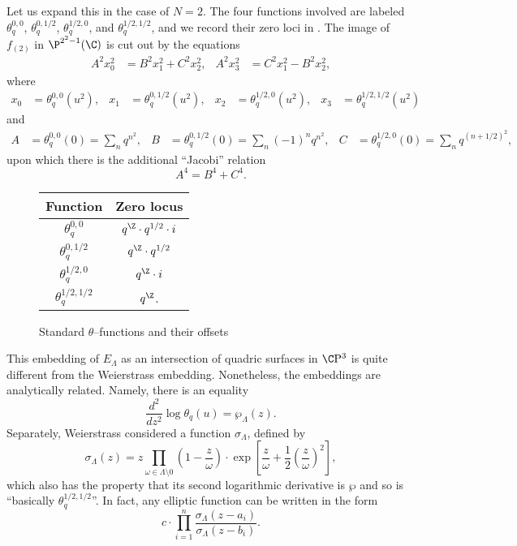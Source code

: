 \begin{example}
Let us expand this in the case of $N = 2$.  The four functions involved are labeled $\theta_q^{0,0}$, $\theta_q^{0,1/2}$, $\theta_q^{1/2,0}$, and $\theta_q^{1/2,1/2}$, and we record their zero loci in .  The image of $f_{(2)}$ in $\P^{2^2 - 1}(\C)$ is cut out by the equations
\begin{align*}
A^2 x_0^2 & = B^2 x_1^2 + C^2 x_2^2, &
A^2 x_3^2 & = C^2 x_1^2 - B^2 x_2^2,
\end{align*}
where
\begin{align*}
x_0 & = \theta_q^{0, 0}(u^2), &
x_1 & = \theta_q^{0, 1/2}(u^2), &
x_2 & = \theta_q^{1/2, 0}(u^2), &
x_3 & = \theta_q^{1/2, 1/2}(u^2)
\end{align*}
and
\begin{align*}
A & = \theta_q^{0, 0}(0) = \sum_n q^{n^2}, &
B & = \theta_q^{0, 1/2}(0) = \sum_n (-1)^n q^{n^2}, &
C & = \theta_q^{1/2, 0}(0) = \sum_n q^{(n + 1/2)^2},
\end{align*}
upon which there is the additional ``Jacobi'' relation \[A^4 = B^4 + C^4.\]
\end{example}

\begin{figure}
\begin{center}
\begin{tabular}{@{}cc@{}} \toprule
Function & Zero locus \\
\midrule
$\theta_q^{0,0}$ & $q^{\Z} \cdot q^{1/2} \cdot i$ \\
$\theta_q^{0,1/2}$ & $q^{\Z} \cdot q^{1/2}$ \\
$\theta_q^{1/2,0}$ & $q^{\Z} \cdot i$ \\
$\theta_q^{1/2,1/2}$ & $q^{\Z}$. \\ \bottomrule
\end{tabular}
\end{center}
\caption{Standard $\theta$--functions and their offsets}\label{ThetaFunctionsTable}
\end{figure}

\begin{remark}
This embedding of $E_\Lambda$ as an intersection of quadric surfaces in $\CP^3$ is quite different from the Weierstrass embedding.  Nonetheless, the embeddings are analytically related.  Namely, there is an equality \[\frac{d^2}{dz^2} \log \theta_q(u) = \wp_\Lambda(z).\]  Separately, Weierstrass considered a function $\sigma_\Lambda$, defined by \[\sigma_\Lambda(z) = z \prod_{\omega \in \Lambda \setminus 0} \left( 1 - \frac{z}{\omega} \right) \cdot \exp \left[ \frac{z}{\omega} + \frac{1}{2} \left( \frac{z}{\omega} \right)^2 \right],\] which also has the property that its second logarithmic derivative is $\wp$ and so is ``basically $\theta_q^{1/2,1/2}$''.  In fact, any elliptic function can be written in the form \[c \cdot \prod_{i=1}^n \frac{\sigma_\Lambda(z - a_i)}{\sigma_\Lambda(z - b_i)}.\]
\end{remark}

